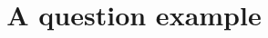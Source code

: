 \documentclass{mathquiz}
\title{A question example}
\begin{document}
  \begin{discussion}
     \lipsum[1]
  \end{discussion}

  \begin{discussion}
     \lipsum[2]
  \end{discussion}
\end{document}
